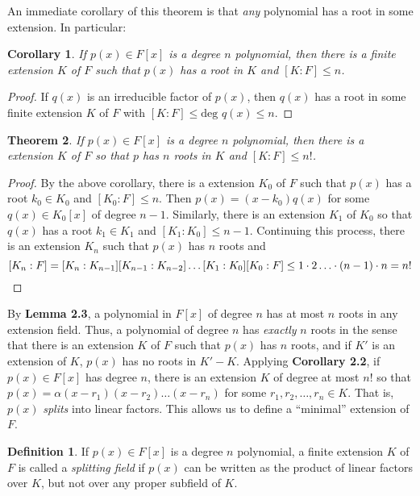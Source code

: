\documentclass[12pt,leqno]{article}
\numberwithin{equation}{section}
\theoremstyle{plain}
\newtheorem{thm}{Theorem}[section]
\newtheorem{cor}[thm]{Corollary}
\theoremstyle{definition}
\newtheorem*{Def}{Definition}
\theoremstyle{remark}
\begin{document}
An immediate corollary of this theorem is that \textit{any} polynomial has a root in some extension. In particular:

\begin{cor}
 If $p(x)\in F[x]$ is a degree $n$ polynomial, then there is a finite extension $K$ of $F$ such that $p(x)$ has a root in $K$ and $[K:F]\leq n$.
\end{cor}

\begin{proof}
 If $q(x)$ is an irreducible factor of $p(x)$, then $q(x)$ has a root in some finite extension $K$ of $F$ with $[K:F]\leq\text{deg }q(x)\leq n$.
\end{proof}

\begin{thm}
 If $p(x)\in F[x]$ is a degree $n$ polynomial, then there is a extension $K$ of $F$ so that $p$ has $n$ roots in $K$ and $[K:F]\leq n!$.
\end{thm}

\begin{proof}
 By the above corollary, there is a extension $K_0$ of $F$ such that $p(x)$ has a root $k_0\in K_0$ and $[K_0:F]\leq n$. Then $p(x)=(x-k_0)q(x)$ for some $q(x)\in K_0[x]$ of degree $n-1$. Similarly, there is an extension $K_1$ of $K_0$ so that $q(x)$ has a root $k_1\in K_1$ and $[K_1:K_0]\leq n-1$. Continuing this process, there is an extension $K_n$ such that $p(x)$ has $n$ roots and \[[K_n:F]=[K_n:K_{n-1}][K_{n-1}:K_{n-2}]\hdots[K_1:K_0][K_0:F]\leq1\cdot2\hdots\cdot(n-1)\cdot n=n!\qedhere\]
\end{proof}

By \textbf{Lemma 2.3}, a polynomial in $F[x]$ of degree $n$ has at most $n$ roots in any extension field. Thus, a polynomial of degree $n$ has \textit{exactly} $n$ roots in the sense that there is an extension $K$ of $F$ such that $p(x)$ has $n$ roots, and if $K'$ is an extension of $K$, $p(x)$ has no roots in $K'-K$. Applying \textbf{Corollary 2.2}, if $p(x)\in F[x]$ has degree $n$, there is an extension $K$ of degree at most $n!$ so that $p(x)=\alpha(x-r_1)(x-r_2)\hdots(x-r_n)$ for some $r_1,r_2,\hdots,r_n\in K$. That is, $p(x)$ \textit{splits} into linear factors. This allows us to define a ``minimal'' extension of $F$. 

\begin{Def}
 If $p(x)\in F[x]$ is a degree $n$ polynomial, a finite extension $K$ of $F$ is called a \textit{splitting field} if $p(x)$ can be written as the product of linear factors over $K$, but not over any proper subfield of $K$.
\end{Def}
\end{document}
